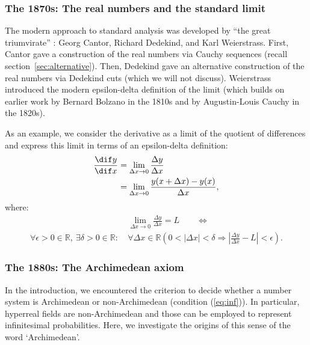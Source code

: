 \subsubsection{The 1870s: The real numbers and the standard limit}\label{sec:standardcalc}
The modern approach to standard analysis was developed by ``the great triumvirate'' \citep[p.~298]{Boyer:1949}: Georg Cantor, Richard Dedekind, and Karl Weierstrass. First, Cantor gave a construction of the real numbers via Cauchy sequences (recall section~\ref{sec:alternative}). Then, Dedekind gave an alternative construction of the real numbers via Dedekind cuts (which we will not discuss). Weierstrass introduced the modern epsilon-delta definition of the limit (which builds on earlier work by Bernard Bolzano in the 1810s and by Augustin-Louis Cauchy in the 1820s).

As an example, we consider the derivative as a limit of the quotient of differences and express this limit in terms of an epsilon-delta definition:
\begin{align*}
\frac{\dif y}{\dif x} &= \lim_{\Delta x\rightarrow0} \frac{\Delta y}{\Delta x}\\
 &= \lim_{\Delta x\rightarrow0} \frac{y(x+\Delta x) - y(x)}{\Delta x},
\end{align*}
where:
\begin{align*}
&\lim_{\Delta x\rightarrow0} \frac{\Delta y}{\Delta x} = L \quad \quad \Leftrightarrow \\
\forall \epsilon > 0 \in \mathbb{R}, \ \exists \delta > 0 \in \mathbb{R}: \ & \forall \Delta x \in \mathbb{R} \left( 0 < |\Delta x| < \delta \Rightarrow | \frac{\Delta y}{\Delta x} - L| < \epsilon \right).
\end{align*}

\subsubsection{The 1880s: The Archimedean axiom}
In the introduction, we encountered the criterion to decide whether a number system is Archimedean or non-Archimedean (condition (\ref{eq:inf})).
In particular, hyperreal fields are non-Archimedean and those can be employed to represent infinitesimal probabilities.
Here, we investigate the origins of this sense of the word `Archimedean'.

